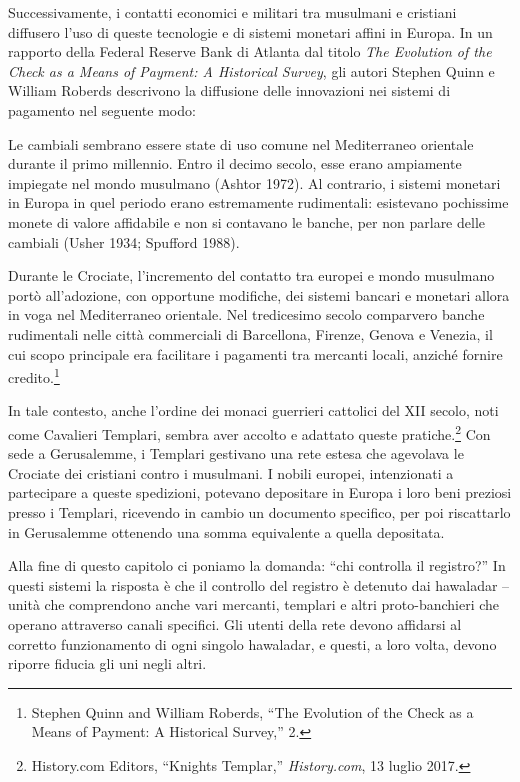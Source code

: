 \documentclass[
  a5paper,
  smalldemyvopaper,10pt,twoside,onecolumn,openright,extrafontsizes,hidelinks]{memoir}
\renewenvironment{quote}%
               {\list{}{\rightmargin=.6cm\leftmargin=.6cm}%
                \itshape \item[]}%
               {\endlist}
\begin{document}
Successivamente, i contatti economici e militari tra musulmani e
cristiani diffusero l'uso di queste tecnologie e di sistemi monetari
affini in Europa. In un rapporto della Federal Reserve Bank di Atlanta
dal titolo \emph{The Evolution of the Check as a Means of Payment: A
Historical Survey}, gli autori Stephen Quinn e William Roberds
descrivono la diffusione delle innovazioni nei sistemi di pagamento nel
seguente modo:

\begin{quote}
Le cambiali sembrano essere state di uso comune nel Mediterraneo
orientale durante il primo millennio. Entro il decimo secolo, esse erano
ampiamente impiegate nel mondo musulmano (Ashtor 1972). Al contrario, i
sistemi monetari in Europa in quel periodo erano estremamente
rudimentali: esistevano pochissime monete di valore affidabile e non si
contavano le banche, per non parlare delle cambiali (Usher 1934;
Spufford 1988).
\end{quote}

\begin{quote}
Durante le Crociate, l'incremento del contatto tra europei e mondo
musulmano portò all'adozione, con opportune modifiche, dei sistemi
bancari e monetari allora in voga nel Mediterraneo orientale. Nel
tredicesimo secolo comparvero banche rudimentali nelle città commerciali
di Barcellona, Firenze, Genova e Venezia, il cui scopo principale era
facilitare i pagamenti tra mercanti locali, anziché fornire
credito.\footnote{Stephen Quinn and William Roberds, ``The Evolution of
  the Check as a Means of Payment: A Historical Survey,'' 2.}
\end{quote}

In tale contesto, anche l'ordine dei monaci guerrieri cattolici del XII
secolo, noti come Cavalieri Templari, sembra aver accolto e adattato
queste pratiche.\footnote{History.com Editors, ``Knights Templar,''
  \emph{History.com}, 13 luglio 2017.} Con sede a Gerusalemme, i
Templari gestivano una rete estesa che agevolava le Crociate dei
cristiani contro i musulmani. I nobili europei, intenzionati a
partecipare a queste spedizioni, potevano depositare in Europa i loro
beni preziosi presso i Templari, ricevendo in cambio un documento
specifico, per poi riscattarlo in Gerusalemme ottenendo una somma
equivalente a quella depositata.

Alla fine di questo capitolo ci poniamo la domanda: ``chi controlla il
registro?'' In questi sistemi la risposta è che il controllo del
registro è detenuto dai hawaladar -- unità che comprendono anche vari
mercanti, templari e altri proto-banchieri che operano attraverso canali
specifici. Gli utenti della rete devono affidarsi al corretto
funzionamento di ogni singolo hawaladar, e questi, a loro volta, devono
riporre fiducia gli uni negli altri.
\end{document}
